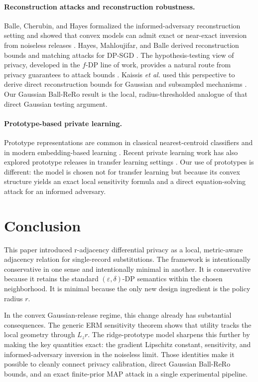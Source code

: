 \documentclass[conference,compsoc]{IEEEtran}
\begin{document}
\paragraph{Reconstruction attacks and reconstruction robustness.}
Balle, Cherubin, and Hayes formalized the informed-adversary reconstruction setting and showed that convex models can admit exact or near-exact inversion from noiseless releases \cite{balle2022informed}. Hayes, Mahloujifar, and Balle derived reconstruction bounds and matching attacks for DP-SGD \cite{hayes2023bounding}. The hypothesis-testing view of privacy, developed in the $f$-DP line of work, provides a natural route from privacy guarantees to attack bounds \cite{dong2022fdp}. Kaissis \emph{et al.} used this perspective to derive direct reconstruction bounds for Gaussian and subsampled mechanisms \cite{kaissis2023rero}. Our Gaussian Ball-ReRo result is the local, radius-thresholded analogue of that direct Gaussian testing argument.

\paragraph{Prototype-based private learning.}
Prototype representations are common in classical nearest-centroid classifiers and in modern embedding-based learning \cite{snell2017prototypical}. Recent private learning work has also explored prototype releases in transfer learning settings \cite{wahdany2025dppl}. Our use of prototypes is different: the model is chosen not for transfer learning but because its convex structure yields an exact local sensitivity formula and a direct equation-solving attack for an informed adversary.

\section{Conclusion}
\label{sec:conclusion}

This paper introduced r-adjacency differential privacy as a local, metric-aware adjacency relation for single-record substitutions. The framework is intentionally conservative in one sense and intentionally minimal in another. It is conservative because it retains the standard $(\varepsilon,\delta)$-DP semantics within the chosen neighborhood. It is minimal because the only new design ingredient is the policy radius $r$.

In the convex Gaussian-release regime, this change already has substantial consequences. The generic ERM sensitivity theorem shows that utility tracks the local geometry through $L_z r$. The ridge-prototype model sharpens this further by making the key quantities exact: the gradient Lipschitz constant, sensitivity, and informed-adversary inversion in the noiseless limit. Those identities make it possible to cleanly connect privacy calibration, direct Gaussian Ball-ReRo bounds, and an exact finite-prior MAP attack in a single experimental pipeline.
\end{document}
